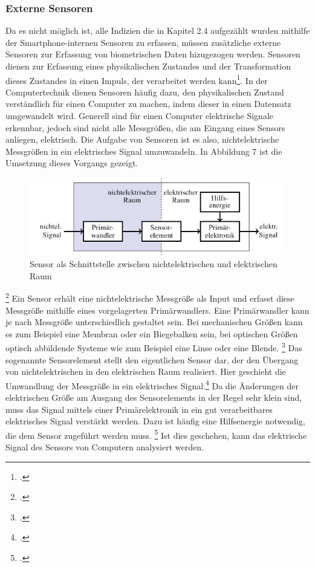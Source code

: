 \subsubsection{Externe Sensoren}
Da es nicht möglich ist, alle Indizien die in Kapitel 2.4 aufgezählt wurden mithilfe der Smartphone-internen Sensoren zu erfassen, müssen zusätzliche externe Sensoren zur Erfassung von biometrischen Daten hizugezogen werden. \newline
Sensoren dienen zur Erfassung eines physikalischen Zustandes und der Transformation dieses Zustandes in einen Impuls, der verarbeitet werden kann\footcite[Vgl.][]{Web18}. In der Computertechnik dienen Sensoren häufig dazu, den physikalischen Zustand verständlich für einen Computer zu machen, indem dieser in einen Datensatz umgewandelt wird. Generell sind für einen Computer elektrische Signale erkennbar, jedoch sind nicht alle Messgrößen, die am Eingang eines Sensors anliegen, elektrisch. Die Aufgabe von Sensoren ist es also, nichtelektrische Messgrößen in ein elektrisches Signal umzuwandeln. \newline
In Abbildung 7 ist die Umsetzung dieses Vorgangs gezeigt.
\begin{figure}[h]
	\centering
	\includegraphics[width=16cm]{Bilder/sensor.png}
	\caption[Sensor als Schnittstelle zwischen nicht-elektrischen und elektrischen Raum]{Sensor als Schnittstelle zwischen nichtelektrischen und elektrischen Raum\footnotemark}
\end{figure}\footcitetext[][S. 347]{Ros13}
Ein Sensor erhält eine nichtelektrische Messgröße als Input und erfasst diese Messgröße mithilfe eines vorgelagerten Primärwandlers. Eine Primärwandler kann je nach Messgröße unterschiedlich gestaltet sein. Bei mechanischen Größen kann es zum Beispiel eine Membran oder ein Biegebalken sein, bei optischen Größen optisch abbildende Systeme wie zum Beispiel eine Linse oder eine Blende. \footcite[Vgl. ][S. 347]{Ros13} \newline \newline Das sogenannte Sensorelement stellt den eigentlichen Sensor dar, der den Übergang von nichtelektrischen in den elektrischen Raum realisiert. Hier geschieht die Umwandlung der Messgröße in ein elektrisches Signal.\footcite[Vgl. ][S. 347]{Ros13} \newline Da die Änderungen der elektrischen Größe am Ausgang des Sensorelements in der Regel sehr klein sind, muss das Signal mittels einer Primärelektronik in ein gut verarbeitbares elektrisches Signal verstärkt werden. Dazu ist häufig eine Hilfsenergie notwendig, die dem Sensor zugeführt werden muss. \footcite[Vgl. ][S. 347]{Ros13} Ist dies geschehen, kann das elektrische Signal des Sensors von Computern analysiert werden.\newline
